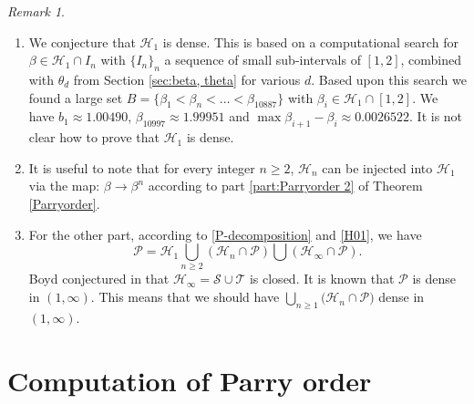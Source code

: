 \documentclass[12pt]{article}
\theoremstyle{plain}
\theoremstyle{remark}
\newtheorem{remark}[theorem]{Remark}
\begin{document}
\begin{remark} {\ }
\begin{enumerate}
 \item We conjecture that $\mathcal{H}_1$ is dense.  This is based on a computational search for $\beta \in \mathcal{H}_1 \cap I_n$ with $\{I_n\}_n$ a sequence of small sub-intervals of $[1,2]$, combined with $\theta_d$ from Section \ref{sec:beta, theta} for various $d$.
 Based upon this search we found a large set $B = \{\beta_1 < \beta_n < \dots < \beta_{10887}\}$ with $\beta_i \in \mathcal{H}_1 \cap [1,2]$.
 We have $b_1 \approx 1.00490$, $\beta_{10997} \approx 1.99951$ and $\max \beta_{i+1}-\beta_i \approx 0.0026522$. 
 It is not clear how to prove that $\mathcal{H}_1$ is dense.
 \item It is useful to note that for every integer $n \geq 2$, $\mathcal{H}_n$ can be injected into $\mathcal{H}_1$ via the map: $\beta \to \beta^n$ according to part \ref{part:Parryorder 2} of Theorem \ref{Parryorder}. %
 \item For the other part, according to \eqref{P-decomposition} and \ref{H01}, we have $$\mathcal{P}= \mathcal{H}_1 \bigcup_{n \geq 2} (\mathcal{H}_n \cap \mathcal{P}) \bigcup (\mathcal{H}_\infty \cap \mathcal{P}).$$ Boyd conjectured in \cite{Boyd1977} that $\mathcal{H}_\infty =\mathcal{S}\cup \mathcal{T}$ is closed.  It is known that $\mathcal{P}$ is dense in $(1,\infty)$.  This means that we should have ${\bigcup_{n \geq 1} (\mathcal{H}_n \cap \mathcal{P}})$ dense in $(1,\infty)$. 
 \end{enumerate}
 \end{remark} 

\section{Computation of Parry order}
\label{sec:3}
\end{document}
